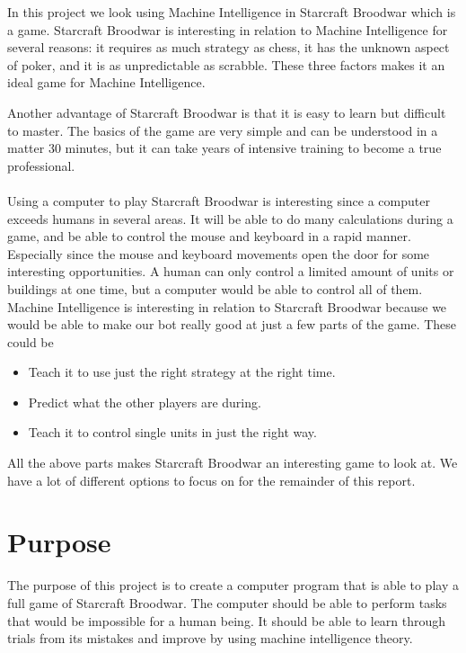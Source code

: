 In this project we look using Machine Intelligence in Starcraft Broodwar which is a \abrts game. Starcraft Broodwar is interesting in relation to Machine Intelligence for several reasons: it requires as much strategy as chess, it has the unknown aspect of poker, and it is as unpredictable as scrabble. These three factors makes it an ideal game for Machine Intelligence.

Another advantage of Starcraft Broodwar is that it is easy to learn but difficult to master. The basics of the game are very simple and can be understood in a matter 30 minutes, but it can take years of intensive training to become a true professional. 
\\
\\
Using a computer to play Starcraft Broodwar is interesting since a computer exceeds humans in several areas. It will be able to do many calculations during a game, and be able to control the mouse and keyboard in a rapid manner. Especially since the mouse and keyboard movements open the door for some interesting opportunities. A human can only control a limited amount of units or buildings at one time, but a computer would be able to control all of them. \\

Machine Intelligence is interesting in relation to Starcraft Broodwar because we would be able to make our bot really good at just a few parts of the game. These could be
\begin{itemize}
	\item Teach it to use just the right strategy at the right time.
	\item Predict what the other players are during.
	\item Teach it to control single units in just the right way.
\end{itemize}

All the above parts makes Starcraft Broodwar an interesting game to look at. We have a lot of different options to focus on for the remainder of this report.

\section{Purpose}

	The purpose of this project is to create a computer program that is able to play a full game of Starcraft Broodwar. The computer should be able to perform tasks that would be impossible for a human being. It should be able to learn through trials from its mistakes and improve by using machine intelligence theory. 



